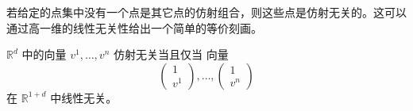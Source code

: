 若给定的点集中没有一个点是其它点的仿射组合，则这些点是仿射无关的。这可以通过高一维的线性无关性给出一个简单的等价刻画。

\bigskip
\noindent
\begin{lemma}\label{lem:7.2}
\({\mathbb{R}}^{d}\) 中的向量 \({v}^{1},\ldots,{v}^{n}\) 仿射无关当且仅当
向量
\begin{equation}
\left( \begin{array}{l} 1 \\  {v}^{1} \end{array}\right),\ldots,\left( \begin{matrix} 1 \\  {v}^{n} \end{matrix}\right)\label{eq:7.4}
\end{equation}
在 \({\mathbb{R}}^{1 + d}\) 中线性无关。
\end{lemma}


